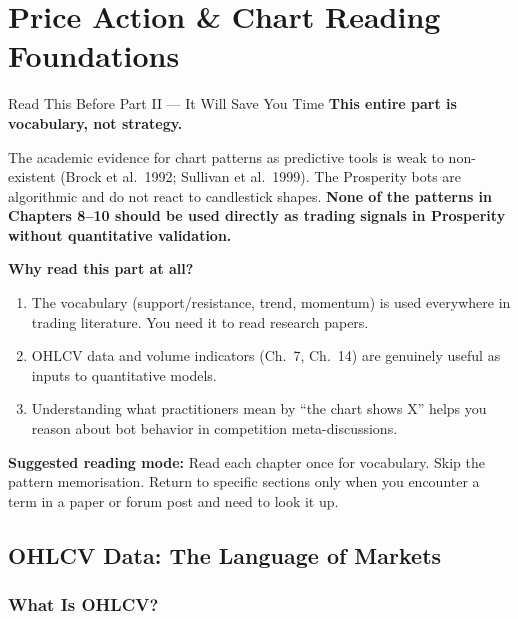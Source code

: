 \documentclass[12pt,a4paper,openany]{report}
\theoremstyle{definition}
\begin{document}

%
%
\part{Price Action \& Chart Reading Foundations}

\begin{warningbox}{Read This Before Part II — It Will Save You Time}
\textbf{This entire part is vocabulary, not strategy.}

The academic evidence for chart patterns as predictive tools is weak to non-existent (Brock et al.\ 1992; Sullivan et al.\ 1999). The Prosperity bots are algorithmic and do not react to candlestick shapes. \textbf{None of the patterns in Chapters 8--10 should be used directly as trading signals in Prosperity without quantitative validation.}

\medskip
\textbf{Why read this part at all?}
\begin{enumerate}[label=\arabic*.]
  \item The vocabulary (support/resistance, trend, momentum) is used everywhere in trading literature. You need it to read research papers.
  \item OHLCV data and volume indicators (Ch.\ 7, Ch.\ 14) are genuinely useful as inputs to quantitative models.
  \item Understanding what practitioners mean by ``the chart shows X'' helps you reason about bot behavior in competition meta-discussions.
\end{enumerate}

\medskip
\textbf{Suggested reading mode:} Read each chapter once for vocabulary. Skip the pattern memorisation. Return to specific sections only when you encounter a term in a paper or forum post and need to look it up.
\end{warningbox}

\chapter{OHLCV Data: The Language of Markets}

\section{What Is OHLCV?}
\end{document}
